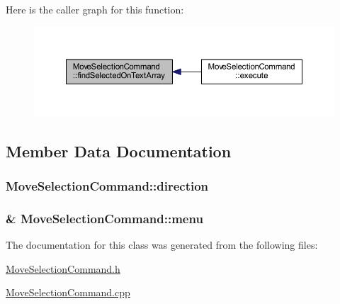 Here is the caller graph for this function\+:\nopagebreak
\begin{figure}[H]
\begin{center}
\leavevmode
\includegraphics[width=350pt]{class_move_selection_command_a6a9d0bed09292f4465c3a09a847ed0be_icgraph}
\end{center}
\end{figure}




\subsection{Member Data Documentation}
\hypertarget{class_move_selection_command_a27a2a41486ddb096f3a1f350395ea0ea}{}
\subsubsection[{direction}]{ Move\+Selection\+Command\+::direction\hspace{0.3cm}{\ttfamily [private]}}\label{class_move_selection_command_a27a2a41486ddb096f3a1f350395ea0ea}
\hypertarget{class_move_selection_command_a744230c9fb6c308c2f05a08d7c45e4c2}{}
\subsubsection[{menu}]{\& Move\+Selection\+Command\+::menu\hspace{0.3cm}{\ttfamily [private]}}\label{class_move_selection_command_a744230c9fb6c308c2f05a08d7c45e4c2}


The documentation for this class was generated from the following files\+:\begin{DoxyCompactItemize}
\item 
\hyperlink{_move_selection_command_8h}{Move\+Selection\+Command.\+h}\item 
\hyperlink{_move_selection_command_8cpp}{Move\+Selection\+Command.\+cpp}\end{DoxyCompactItemize}
